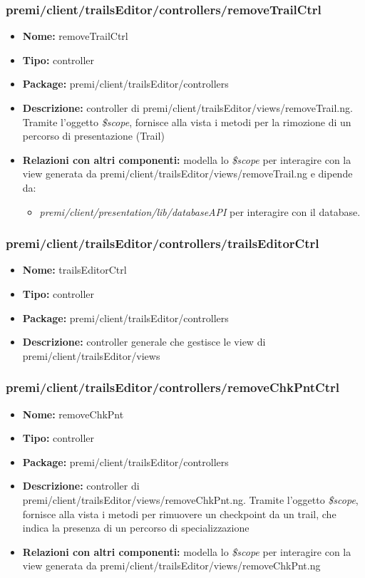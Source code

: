 \subsubsection{premi/client/trailsEditor/controllers/removeTrailCtrl}
\begin{itemize}
  \item[] \textbf{Nome:} removeTrailCtrl
  \item[] \textbf{Tipo:} controller
  \item[] \textbf{Package:} premi/client/trailsEditor/controllers
  \item[] \textbf{Descrizione:} controller di premi/client/trailsEditor/views/removeTrail.ng. Tramite l'oggetto \textit{\$scope}, fornisce alla vista i metodi per la rimozione di un percorso di presentazione (Trail)
  \item[] \textbf{Relazioni con altri componenti:} modella lo \textit{\$scope} per interagire con la view generata da premi/client/trailsEditor/views/removeTrail.ng e dipende da:
  \begin{itemize}
  	\item \textit{premi/client/presentation/lib/databaseAPI} per interagire con il database.
  \end{itemize}
\end{itemize}
\subsubsection{premi/client/trailsEditor/controllers/trailsEditorCtrl}
\begin{itemize}
  \item[] \textbf{Nome:} trailsEditorCtrl
  \item[] \textbf{Tipo:} controller
  \item[] \textbf{Package:} premi/client/trailsEditor/controllers
  \item[] \textbf{Descrizione:} controller generale che gestisce le view di premi/client/trailsEditor/views
\end{itemize}
\subsubsection{premi/client/trailsEditor/controllers/removeChkPntCtrl}
\begin{itemize}
  \item[] \textbf{Nome:} removeChkPnt
  \item[] \textbf{Tipo:} controller
  \item[] \textbf{Package:} premi/client/trailsEditor/controllers
  \item[] \textbf{Descrizione:} controller di premi/client/trailsEditor/views/removeChkPnt.ng. Tramite l'oggetto \textit{\$scope}, fornisce alla vista i metodi per rimuovere un checkpoint da un trail, che indica la presenza di un percorso di specializzazione
  \item[] \textbf{Relazioni con altri componenti:} modella lo \textit{\$scope} per interagire con la view generata da premi/client/trailsEditor/views/removeChkPnt.ng
\end{itemize}

